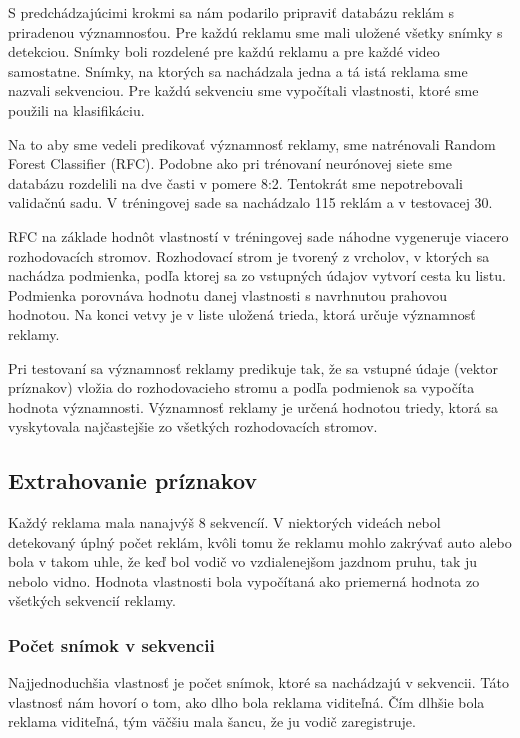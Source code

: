 S predchádzajúcimi krokmi sa nám podarilo pripraviť databázu reklám s priradenou významnosťou. Pre každú reklamu sme mali uložené všetky snímky s detekciou. Snímky boli rozdelené pre každú reklamu a pre každé video samostatne. Snímky, na ktorých sa nachádzala jedna a tá istá reklama sme nazvali sekvenciou. Pre každú sekvenciu sme vypočítali vlastnosti, ktoré sme použili na klasifikáciu.

Na to aby sme vedeli predikovať významnosť reklamy, sme natrénovali Random Forest Classifier (RFC). Podobne ako pri trénovaní neurónovej siete sme databázu rozdelili na dve časti v pomere 8:2. Tentokrát sme nepotrebovali validačnú sadu. V tréningovej sade sa nachádzalo 115 reklám a v testovacej 30.

RFC na základe hodnôt vlastností v tréningovej sade náhodne vygeneruje viacero rozhodovacích stromov. Rozhodovací strom je tvorený z vrcholov, v ktorých sa nachádza podmienka, podľa ktorej sa zo vstupných údajov vytvorí cesta ku listu. Podmienka porovnáva hodnotu danej vlastnosti s navrhnutou prahovou hodnotou. Na konci vetvy je v liste uložená trieda, ktorá určuje významnosť reklamy.

Pri testovaní sa významnosť reklamy predikuje tak, že sa vstupné údaje (vektor príznakov) vložia do rozhodovacieho stromu a podľa podmienok sa vypočíta hodnota významnosti. Významnosť reklamy je určená hodnotou triedy, ktorá sa vyskytovala najčastejšie zo všetkých rozhodovacích stromov.

\subsection{Extrahovanie príznakov}

Každý reklama mala nanajvýš 8 sekvencíí. V niektorých videách nebol detekovaný úplný počet reklám, kvôli tomu že reklamu mohlo zakrývať auto alebo bola v takom uhle, že keď bol vodič vo vzdialenejšom jazdnom pruhu, tak ju nebolo vidno. Hodnota vlastnosti bola vypočítaná ako priemerná hodnota zo všetkých sekvencií reklamy.

\subsubsection{Počet snímok v sekvencii}

Najjednoduchšia vlastnosť je počet snímok, ktoré sa nachádzajú v sekvencii. Táto vlastnosť nám hovorí o tom, ako dlho bola reklama viditeľná. Čím dlhšie bola reklama viditeľná, tým väčšiu mala šancu, že ju vodič zaregistruje.

